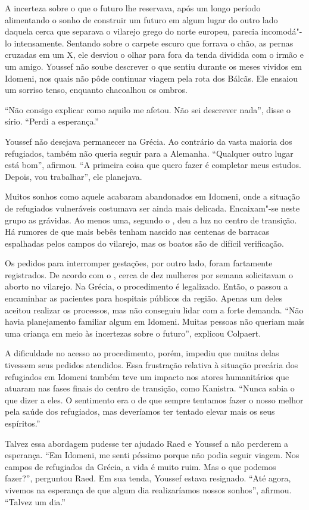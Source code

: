 A incerteza sobre o que o futuro lhe reservava, após um longo período
alimentando o sonho de construir um futuro em algum lugar do outro lado
daquela cerca que separava o vilarejo grego do norte europeu, parecia
incomodá"-lo intensamente. Sentando sobre o carpete escuro que forrava o
chão, as pernas cruzadas em um X, ele desviou o olhar para fora da tenda
dividida com o irmão e um amigo.  Youssef não soube
descrever o que sentiu durante os meses vividos em Idomeni, nos quais
não pôde continuar viagem pela rota dos Bálcãs. Ele ensaiou um sorriso
tenso, enquanto chacoalhou os ombros.

``Não consigo explicar como aquilo me afetou. Não sei descrever nada'',
disse o sírio. ``Perdi a esperança.''

Youssef não desejava permanecer na Grécia. Ao contrário da vasta maioria
dos refugiados, também não queria seguir para a Alemanha. ``Qualquer
outro lugar está bom'', afirmou. ``A primeira coisa que quero fazer é
completar meus estudos. Depois, vou trabalhar'', ele planejava.

Muitos sonhos como aquele acabaram abandonados em Idomeni, onde a
situação de refugiados vulneráveis costumava ser ainda mais delicada.
Encaixam"-se neste grupo as grávidas. Ao menos uma, segundo o , deu a
luz no centro de transição. Há rumores de que mais bebês tenham nascido
nas centenas de barracas espalhadas pelos campos do vilarejo, mas os
boatos são de difícil verificação.

Os pedidos para interromper gestações, por outro lado, foram fartamente
registrados. De acordo com o , cerca de dez mulheres por semana solicitavam o
aborto no vilarejo. Na Grécia, o procedimento é legalizado.
Então, o  passou a encaminhar as pacientes para hospitais públicos da
região. Apenas um deles aceitou realizar os processos, mas não conseguiu
lidar com a forte demanda. ``Não havia planejamento familiar algum em
Idomeni. Muitas pessoas não queriam mais uma criança em meio às
incertezas sobre o futuro'', explicou Colpaert.

A dificuldade no acesso ao procedimento, porém, impediu que muitas delas
tivessem seus pedidos atendidos. Essa frustração relativa à situação
precária dos refugiados em Idomeni também teve um impacto nos atores
humanitários que atuaram nas fases finais do centro de transição, como Kanistra.
``Nunca sabia o que dizer a eles. O sentimento
era o de que sempre tentamos fazer o nosso melhor pela saúde dos
refugiados, mas deveríamos ter tentado elevar mais os seus espíritos.''

Talvez essa abordagem pudesse ter ajudado Raed e Youssef a não perderem
a esperança. ``Em Idomeni, me senti péssimo porque não podia seguir
viagem. Nos campos de refugiados da Grécia, a vida é muito ruim. Mas o
que podemos fazer?'', perguntou Raed. Em sua tenda, Youssef estava
resignado. ``Até agora, vivemos na esperança de que algum dia
realizaríamos nossos sonhos'', afirmou. ``Talvez um dia.''


